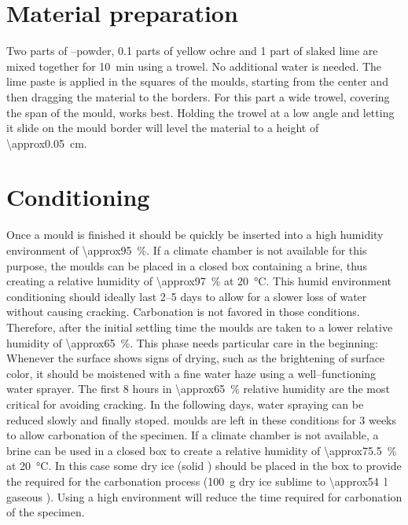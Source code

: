 \documentclass[review]{elsarticle}
\begin{document}
\section{Material preparation}

Two parts of --powder,
0.1 parts of yellow ochre and 1 part of slaked lime are mixed together for \SI{10}{\minute} using a trowel.
No additional water is needed.
The lime paste is applied in the squares of the moulds, starting from the center and then dragging the material to the borders.
For this part a wide trowel, covering the span of the mould, works best.
Holding the trowel at a low angle and letting it slide on the mould border will level the material to a height of \SI{\approx0.05}{\cm}.


\section{Conditioning}

Once a mould is finished it should be quickly be inserted into a high humidity environment of \SI{\approx95}{\percent}.
If a climate chamber is not available for this purpose, the moulds can be placed in a closed box containing a  brine, thus creating a relative humidity of \SI{\approx97}{\percent} at \SI{20}{\celsius}.
This humid environment conditioning should ideally last 2--5 days to allow for a slower loss of water without causing cracking.
Carbonation is not favored in those conditions.
Therefore, after the initial settling time the moulds are taken to a lower relative humidity of \SI{\approx65}{\percent}.
This phase needs particular care in the beginning:
Whenever the surface shows signs of drying, such as the brightening of surface color, it should be moistened with a fine water haze using a well--functioning water sprayer.
The first 8 hours in \SI{\approx65}{\percent} relative humidity are the most critical for avoiding cracking.
In the following days, water spraying can be reduced slowly and finally stoped.
moulds are left in these conditions for 3 weeks to allow carbonation of the specimen.
If a climate chamber is not available, a  brine can be used in a closed box to create a relative humidity of \SI{\approx75.5}{\percent} at \SI{20}{\celsius}.
In this case some dry ice (solid ) should be placed in the box to provide the required  for the carbonation process (\SI{100}{\g} dry ice sublime to \SI{\approx54}{\l} gaseous ).
Using a high  environment will reduce the time required for carbonation of the specimen.
\end{document}
